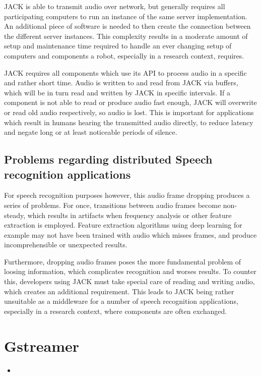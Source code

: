 JACK is able to transmit audio over network, but generally requires all participating computers to run an instance of the same server implementation. 
An additional piece of software is needed to then create the connection between the different server instances. 
This complexity results in a moderate amount of setup and maintenance time required to handle an ever changing setup of computers and components a robot, especially in a research context, requires.

JACK requires all components which use its API to process audio in a specific and rather short time. 
Audio is written to and read from JACK via buffers, which will be in turn read and written by JACK in specific intervals.
If a component is not able to read or produce audio fast enough, JACK will overwrite or read old audio respectively, so audio is lost. 
This is important for applications which result in humans hearing the transmitted audio directly, to reduce latency and negate long or at least noticeable periods of silence.

\subsection{Problems regarding distributed Speech recognition applications}
For speech recognition purposes however, this audio frame dropping produces a series of problems. 
For once, transitions between audio frames become non-steady, which results in artifacts when frequency analysis or other feature extraction is employed.
Feature extraction algorithms using deep learning for example may not have been trained with audio which misses frames, and produce incomprehensible or unexpected results.

Furthermore, dropping audio frames poses the more fundamental problem of loosing information, which complicates recognition and worses results. 
To counter this, developers using JACK must take special care of reading and writing audio, which creates an additional requirement.
This leads to JACK being rather unsuitable as a middleware for a number of speech recognition applications, especially in a research context, where components are often exchanged.


\section{Gstreamer}

\begin{itemize}
	\item \cite{Gstreamer}
\end{itemize}

